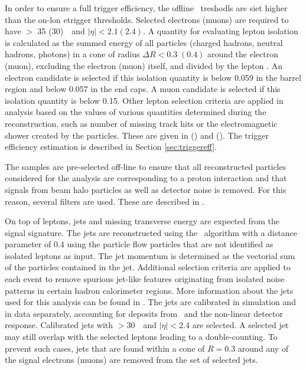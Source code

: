 In order to ensure a full trigger efficiency, the offline \pt\ treshodls are siet higher than the on-lon etrigger thresholds. 
Selected electrons (muons) are required to have \pt $>$ 35 (30)~\GeV\ and $|\eta| < 2.1 (2.4)$. A quantity for evaluating lepton isolation is calculated as the summed energy of all particles (charged hadrons, neutral hadrons, photons) in a cone of radius $\Delta R < 0.3 \;(0.4)$ around the electron (muon), excluding the electron (muon) itself, and divided by the lepton \pt.  An electron candidate is selected if this isolation quantity is below 0.059 in the barrel region and below 0.057 in the end caps.  A muon candidate is selected if this isolation quantity is below 0.15. Other lepton selection criteria are applied in analysis based on the values of various quantities determined during the reconstruction, such as number of missing track hits or the electromagnetic shower created by the particles. These are given in  () and  (). The trigger efficiency estimation is described in Section \ref{sec:triggereff}.


The samples are pre-selected off-line to ensure that all reconstructed particles considered for the analysis are corresponding to a proton interaction and that signals from beam halo particles as well as detector noise is removed. For this reason, several filters are used. These are described in .

On top of leptons, jets and missing transverse energy are expected from the signal signature. The jets are reconstructed using the \antikt\ algorithm with a distance parameter of 0.4 using the particle flow particles that are not identified as isolated leptons as input. The jet momentum is determined as the vectorial sum of the particles contained in the jet. Additional selection criteria are applied to each event to remove spurious jet-like features originating from isolated noise patterns in certain hadron calorimeter regions. More information about the jets used for this analysis can be found in . The jets are calibrated in simulation and in data separately, accounting for deposits from \pu\ and the non-linear detector response. Calibrated jets with \pt $> 30$~\GeV\ and $|\eta| < 2.4$ are selected.  A selected jet may still overlap with the selected leptons leading to a double-counting. To prevent such cases, jets that are found within a cone of  $R = 0.3$ around any of the signal electrons (muons) are removed from the set of selected jets.

